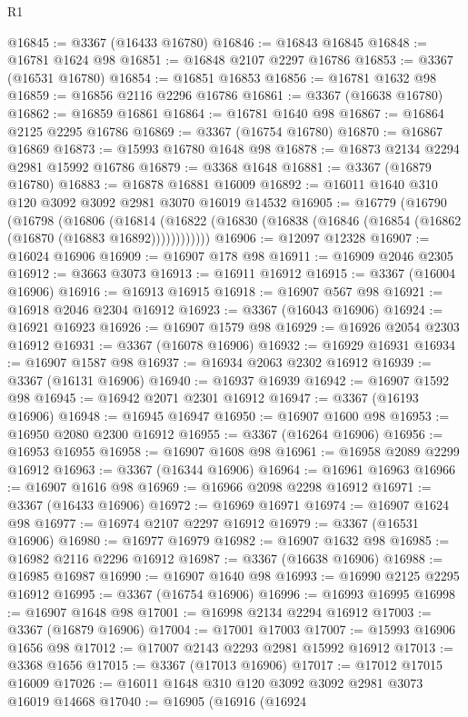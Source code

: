 \begin{lexlean}{R1}
\begin{coremodule}
@16845 := @3367 (@16433 @16780)
@16846 := @16843 @16845
@16848 := @16781 @1624 @98
@16851 := @16848 @2107 @2297 @16786
@16853 := @3367 (@16531 @16780)
@16854 := @16851 @16853
@16856 := @16781 @1632 @98
@16859 := @16856 @2116 @2296 @16786
@16861 := @3367 (@16638 @16780)
@16862 := @16859 @16861
@16864 := @16781 @1640 @98
@16867 := @16864 @2125 @2295 @16786
@16869 := @3367 (@16754 @16780)
@16870 := @16867 @16869
@16873 := @15993 @16780 @1648 @98
@16878 := @16873 @2134 @2294 @2981 @15992 @16786
@16879 := @3368 @1648
@16881 := @3367 (@16879 @16780)
@16883 := @16878 @16881 @16009
@16892 := @16011 @1640 @310 @120 @3092 @3092 @2981 @3070 @16019 @14532
@16905 := @16779
    (@16790
      (@16798
        (@16806
          (@16814 (@16822 (@16830 (@16838 (@16846 (@16854 (@16862 (@16870 (@16883 @16892))))))))))))
@16906 := @12097 @12328
@16907 := @16024 @16906
@16909 := @16907 @178 @98
@16911 := @16909 @2046 @2305
@16912 := @3663 @3073
@16913 := @16911 @16912
@16915 := @3367 (@16004 @16906)
@16916 := @16913 @16915
@16918 := @16907 @567 @98
@16921 := @16918 @2046 @2304 @16912
@16923 := @3367 (@16043 @16906)
@16924 := @16921 @16923
@16926 := @16907 @1579 @98
@16929 := @16926 @2054 @2303 @16912
@16931 := @3367 (@16078 @16906)
@16932 := @16929 @16931
@16934 := @16907 @1587 @98
@16937 := @16934 @2063 @2302 @16912
@16939 := @3367 (@16131 @16906)
@16940 := @16937 @16939
@16942 := @16907 @1592 @98
@16945 := @16942 @2071 @2301 @16912
@16947 := @3367 (@16193 @16906)
@16948 := @16945 @16947
@16950 := @16907 @1600 @98
@16953 := @16950 @2080 @2300 @16912
@16955 := @3367 (@16264 @16906)
@16956 := @16953 @16955
@16958 := @16907 @1608 @98
@16961 := @16958 @2089 @2299 @16912
@16963 := @3367 (@16344 @16906)
@16964 := @16961 @16963
@16966 := @16907 @1616 @98
@16969 := @16966 @2098 @2298 @16912
@16971 := @3367 (@16433 @16906)
@16972 := @16969 @16971
@16974 := @16907 @1624 @98
@16977 := @16974 @2107 @2297 @16912
@16979 := @3367 (@16531 @16906)
@16980 := @16977 @16979
@16982 := @16907 @1632 @98
@16985 := @16982 @2116 @2296 @16912
@16987 := @3367 (@16638 @16906)
@16988 := @16985 @16987
@16990 := @16907 @1640 @98
@16993 := @16990 @2125 @2295 @16912
@16995 := @3367 (@16754 @16906)
@16996 := @16993 @16995
@16998 := @16907 @1648 @98
@17001 := @16998 @2134 @2294 @16912
@17003 := @3367 (@16879 @16906)
@17004 := @17001 @17003
@17007 := @15993 @16906 @1656 @98
@17012 := @17007 @2143 @2293 @2981 @15992 @16912
@17013 := @3368 @1656
@17015 := @3367 (@17013 @16906)
@17017 := @17012 @17015 @16009
@17026 := @16011 @1648 @310 @120 @3092 @3092 @2981 @3073 @16019 @14668
@17040 := @16905
    (@16916
      (@16924

\end{coremodule}
\end{lexlean}
